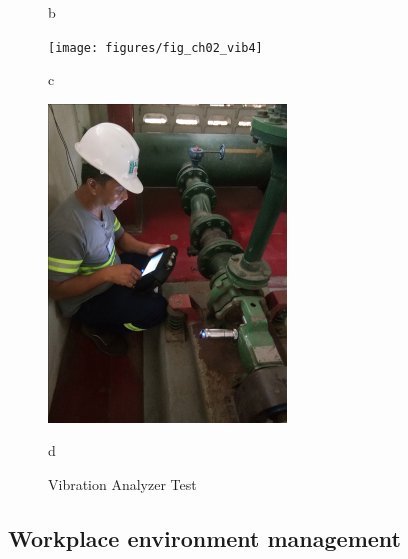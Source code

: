\begin{figure}[ht]
\begin{minipage}[b]{0.225\linewidth}
		\caption{b}
	\end{minipage}
	\hspace{0.05cm}
	\begin{minipage}[b]{0.225\linewidth}
		\centering
		\texttt{[image: figures/fig\_ch02\_vib4]}
		\caption{c}
	\end{minipage}
	\hspace{0.05cm}
	\begin{minipage}[b]{0.225\linewidth}
		\centering
		\includegraphics[width=\textwidth]{figures/fig_ch02_vib1}
		\caption{d}
	\end{minipage}
	\caption{Vibration Analyzer Test}
	\label{fig_ch02_vib}	
\end{figure}


\subsection{Workplace environment management}
\label{237}

